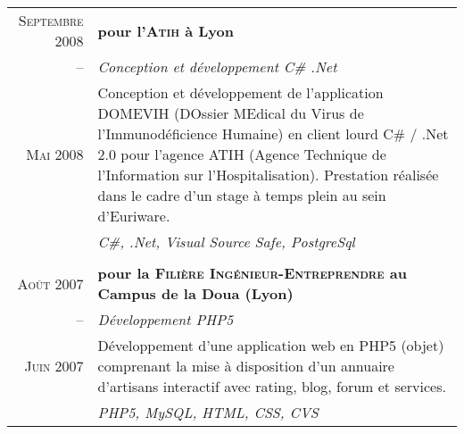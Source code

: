 \documentclass[a4paper,10pt]{article}
\begin{document}
\begin{supertabular}{r|p{11cm}}
  \textsc{Septembre 2008} & \textbf{pour l'\textsc{Atih} à Lyon}                                                         \\
  -- & \emph{Conception et développement C\# .Net}                                                                       \\
  \footnotesize{\textsc{Mai 2008}} & \footnotesize{Conception et développement de l’application DOMEVIH (DOssier MEdical du Virus de l’Immunodéficience Humaine) en client lourd C\# / .Net 2.0 pour l’agence ATIH (Agence Technique de l'Information sur l'Hospitalisation). Prestation réalisée dans le cadre d'un stage à temps plein au sein d'Euriware.} \\
  & \emph{C\#, .Net, Visual Source Safe, PostgreSql}                                                                     \\
                                                                                                     \\
  \textsc{Août 2007} & \textbf{pour la \textsc{Filière Ingénieur-Entreprendre} au Campus de la Doua (Lyon)}              \\
  -- & \emph{Développement PHP5}                                                                                         \\
  \footnotesize{\textsc{Juin 2007}} & \footnotesize{Développement d’une application web en PHP5 (objet) comprenant la mise à disposition d’un annuaire d’artisans interactif avec rating, blog, forum et services.} \\
  & \emph{PHP5, MySQL, HTML, CSS, CVS}                                                                                   \\

\end{supertabular}
\\
\end{document}
